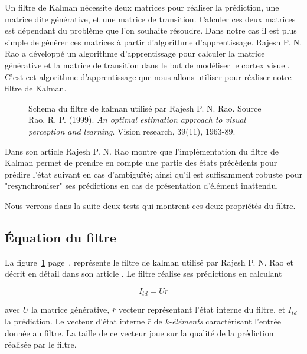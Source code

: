 Un filtre de Kalman nécessite deux matrices pour réaliser la prédiction, une
matrice dite générative, et une matrice de transition\cite{Rao1999}. Calculer
ces deux matrices est dépendant du problème que l'on souhaite résoudre. Dans
notre cas il est plus simple de générer ces matrices à partir d'algorithme
d'apprentissage. Rajesh P. N. Rao a développé un algorithme d'apprentissage
pour calculer la matrice générative et la matrice de transition dans le but de
modéliser le cortex visuel\cite{Rao1999}. C'est cet algorithme d'apprentissage
que nous allons utiliser pour réaliser notre filtre de Kalman.

\begin{figure}[ht]
   \begin{center}
   \end{center}
   \caption[Schema du filtre de kalman]{Schema du filtre de kalman utilisé par
   Rajesh P. N. Rao. Source Rao, R. P. (1999). \textit{An optimal estimation
   approach to visual perception and learning}. Vision research, 39(11),
   1963-89. \cite{Rao1999}}
   \label{fig:filtre_kalman}
\end{figure}

Dans son article\cite{Rao1999} Rajesh P. N. Rao montre que l'implémentation du
filtre de Kalman permet de prendre en compte une partie des états précédents
pour prédire l'état suivant en cas d'ambiguïté; ainsi qu'il est suffisamment
robuste pour "resynchroniser" ses prédictions en cas de présentation d'élément
inattendu.

Nous verrons dans la suite deux tests qui montrent ces deux propriétés du filtre.

\subsection{Équation du filtre} %
\label{sub:Équation du filtre}

La figure~\ref{fig:filtre_kalman} page~\pageref{fig:filtre_kalman}, représente
le filtre de kalman utilisé par Rajesh P. N. Rao et décrit en détail dans son
article \cite{Rao1999}. Le filtre réalise ses prédictions en calculant

\[ I_{td} = U\bar{r} \]

avec $U$ la matrice générative, $\bar{r}$ vecteur représentant l'état interne
du filtre, et $I_{td}$ la prédiction. Le vecteur d'état interne $\bar{r}$ de
\textit{k-éléments} caractérisant l'entrée donnée au filtre. La taille de ce
vecteur joue sur la qualité de la prédiction réalisée par le filtre.

